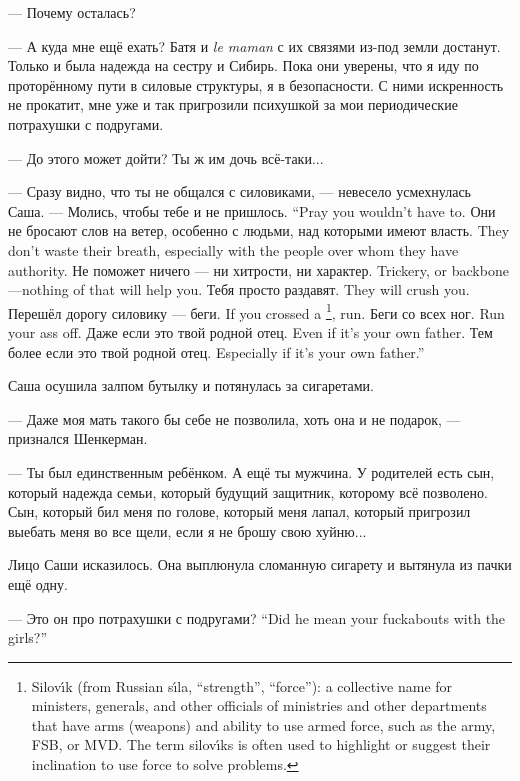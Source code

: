 --- Почему осталась?

--- А куда мне ещё ехать?
Батя и \textit{le maman} с их связями из-под земли достанут.
Только и была надежда на сестру и Сибирь.
Пока они уверены, что я иду по проторённому пути в силовые структуры, я в безопасности.
С ними искренность не прокатит, мне уже и так пригрозили психушкой за мои периодические потрахушки с подругами.

--- До этого может дойти?
Ты ж им дочь всё-таки...

--- Сразу видно, что ты не общался с силовиками, --- невесело усмехнулась Саша.
{--- Молись, чтобы тебе и не пришлось.}
{``Pray you wouldn't have to.}
{Они не бросают слов на ветер, особенно с людьми, над которыми имеют власть.}
{They don't waste their breath, especially with the people over whom they have authority.}
{Не поможет ничего --- ни хитрости, ни характер.}
{Trickery, or backbone---nothing of that will help you.}
{Тебя просто раздавят.}
{They will crush you.}
{Перешёл дорогу силовику --- беги.}
{If you crossed a \silovik\footnote{Silov\'{\i}k (from Russian s\'{\i}la, ``strength'', ``force''): a collective name for ministers, generals, and other officials of ministries and other departments that have arms (weapons) and ability to use armed force, such as the army, FSB, or MVD. The term silov\'{\i}ks is often used to highlight or suggest their inclination to use force to solve problems.}, run.}
{Беги со всех ног.}
{Run your ass off.}
{Даже если это твой родной отец.}
{Even if it's your own father.}
{Тем более если это твой родной отец.}
{Especially if it's your own father.''}

Саша осушила залпом бутылку и потянулась за сигаретами.

--- Даже моя мать такого бы себе не позволила, хоть она и не подарок, --- признался Шенкерман.

--- Ты был единственным ребёнком.
А ещё ты мужчина.
У родителей есть сын, который надежда семьи, который будущий защитник, которому всё позволено.
Сын, который бил меня по голове, который меня лапал, который пригрозил выебать меня во все щели, если я не брошу свою хуйню...

Лицо Саши исказилось.
Она выплюнула сломанную сигарету и вытянула из пачки ещё одну.

{--- Это он про потрахушки с подругами?}
{``Did he mean your fuckabouts with the girls?''}

